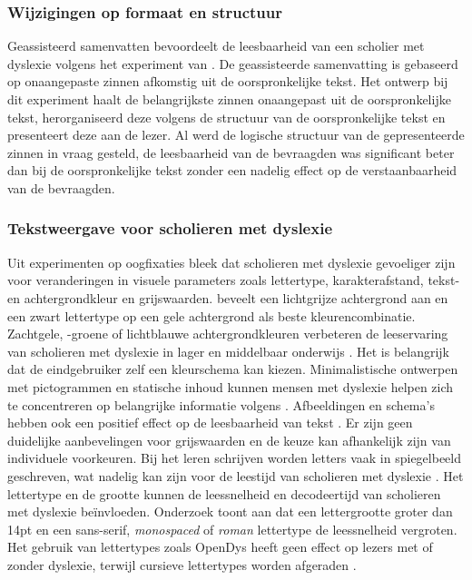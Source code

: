 \subsubsection{Wijzigingen op formaat en structuur}

Geassisteerd samenvatten bevoordeelt de leesbaarheid van een scholier met dyslexie volgens het experiment van \textcite{Nandhini2013}. De geassisteerde samenvatting is gebaseerd op onaangepaste zinnen afkomstig uit de oorspronkelijke tekst. Het ontwerp bij dit experiment haalt de belangrijkste zinnen onaangepast uit de oorspronkelijke tekst, herorganiseerd deze volgens de structuur van de oorspronkelijke tekst en presenteert deze aan de lezer. Al werd de logische structuur van de gepresenteerde zinnen in vraag gesteld, de leesbaarheid van de bevraagden was significant beter dan bij de oorspronkelijke tekst zonder een nadelig effect op de verstaanbaarheid van de bevraagden.

\subsubsection{Tekstweergave voor scholieren met dyslexie}

Uit experimenten op oogfixaties bleek dat scholieren met dyslexie gevoeliger zijn voor veranderingen in visuele parameters zoals lettertype, karakterafstand, tekst- en achtergrondkleur en grijswaarden. \textcite{Rello2015} beveelt een lichtgrijze achtergrond aan en een zwart lettertype op een gele achtergrond als beste kleurencombinatie. Zachtgele, -groene of lichtblauwe achtergrondkleuren verbeteren de leeservaring van scholieren met dyslexie in lager en middelbaar onderwijs \autocite{Bezem2016, Rello2017}. Het is belangrijk dat de eindgebruiker zelf een kleurschema kan kiezen. Minimalistische ontwerpen met pictogrammen en statische inhoud kunnen mensen met dyslexie helpen zich te concentreren op belangrijke informatie volgens \textcite{Anthony2020}. Afbeeldingen en schema's hebben ook een positief effect op de leesbaarheid van tekst \autocite{Rello2012b}. Er zijn geen duidelijke aanbevelingen voor grijswaarden en de keuze kan afhankelijk zijn van individuele voorkeuren. Bij het leren schrijven worden letters vaak in spiegelbeeld geschreven, wat nadelig kan zijn voor de leestijd van scholieren met dyslexie \autocite{Bonte2020, Romanovska2021}. Het lettertype en de grootte kunnen de leessnelheid en decodeertijd van scholieren met dyslexie beïnvloeden. Onderzoek toont aan dat een lettergrootte groter dan 14pt en een sans-serif, \textit{monospaced} of \textit{roman} lettertype de leessnelheid vergroten. Het gebruik van lettertypes zoals OpenDys heeft geen effect op lezers met of zonder dyslexie, terwijl cursieve lettertypes worden afgeraden \autocite{Rello2013b, Rello2015}.

